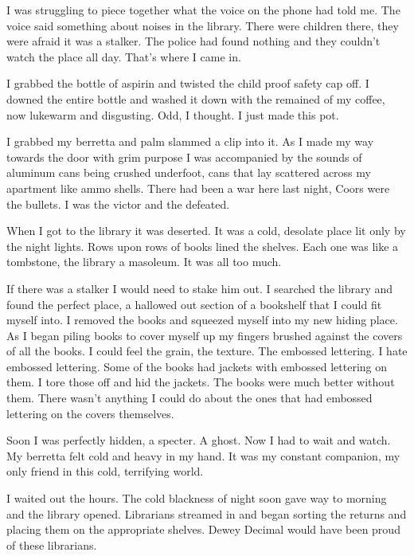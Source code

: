 I was struggling to piece together what the voice on the phone had
told me. The voice said something about noises in the library.
There were children there, they were afraid it was a stalker. The
police had found nothing and they couldn't watch the place all day.
That's where I came in.



I grabbed the bottle of aspirin and twisted the child proof safety
cap off. I downed the entire bottle and washed it down with the
remained of my coffee, now lukewarm and disgusting. Odd, I thought.
I just made this pot.



I grabbed my berretta and palm slammed a clip into it. As I made my
way towards the door with grim purpose I was accompanied by the
sounds of aluminum cans being crushed underfoot, cans that lay
scattered across my apartment like ammo shells. There had been a
war here last night, Coors were the bullets. I was the victor and
the defeated.



When I got to the library it was deserted. It was a cold, desolate
place lit only by the night lights. Rows upon rows of books lined
the shelves. Each one was like a tombstone, the library a masoleum.
It was all too much.



If there was a stalker I would need to stake him out. I searched
the library and found the perfect place, a hallowed out section of
a bookshelf that I could fit myself into. I removed the books and
squeezed myself into my new hiding place. As I began piling books
to cover myself up my fingers brushed against the covers of all the
books. I could feel the grain, the texture. The embossed lettering.
I hate embossed lettering. Some of the books had jackets with
embossed lettering on them. I tore those off and hid the jackets.
The books were much better without them. There wasn't anything I
could do about the ones that had embossed lettering on the covers
themselves.



Soon I was perfectly hidden, a specter. A ghost. Now I had to wait
and watch. My berretta felt cold and heavy in my hand. It was my
constant companion, my only friend in this cold, terrifying
world.



I waited out the hours. The cold blackness of night soon gave way
to morning and the library opened. Librarians streamed in and began
sorting the returns and placing them on the appropriate shelves.
Dewey Decimal would have been proud of these librarians.




